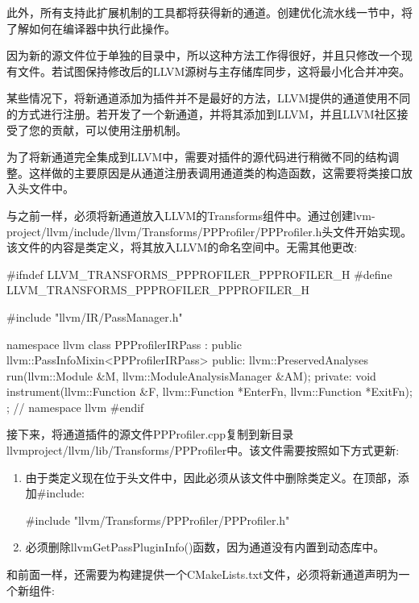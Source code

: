 此外，所有支持此扩展机制的工具都将获得新的通道。创建优化流水线一节中，将了解如何在编译器中执行此操作。

因为新的源文件位于单独的目录中，所以这种方法工作得很好，并且只修改一个现有文件。若试图保持修改后的LLVM源树与主存储库同步，这将最小化合并冲突。

某些情况下，将新通道添加为插件并不是最好的方法，LLVM提供的通道使用不同的方式进行注册。若开发了一个新通道，并将其添加到LLVM，并且LLVM社区接受了您的贡献，可以使用注册机制。


为了将新通道完全集成到LLVM中，需要对插件的源代码进行稍微不同的结构调整。这样做的主要原因是从通道注册表调用通道类的构造函数，这需要将类接口放入头文件中。

与之前一样，必须将新通道放入LLVM的Transforms组件中。通过创建lvm-project/llvm/include/llvm/Transforms/PPProfiler/PPProfiler.h头文件开始实现。该文件的内容是类定义，将其放入LLVM的命名空间中。无需其他更改:

\begin{cpp}
#ifndef LLVM_TRANSFORMS_PPPROFILER_PPPROFILER_H
#define LLVM_TRANSFORMS_PPPROFILER_PPPROFILER_H

#include "llvm/IR/PassManager.h"

namespace llvm {
class PPProfilerIRPass
    : public llvm::PassInfoMixin<PPProfilerIRPass> {
public:
    llvm::PreservedAnalyses
    run(llvm::Module &M, llvm::ModuleAnalysisManager &AM);
private:
    void instrument(llvm::Function &F,
                    llvm::Function *EnterFn,
                    llvm::Function *ExitFn);
};
} // namespace llvm
#endif
\end{cpp}

接下来，将通道插件的源文件PPProfiler.cpp复制到新目录llvmproject/llvm/lib/Transforms/PPProfiler中。该文件需要按照如下方式更新:

\begin{enumerate}
\item
由于类定义现在位于头文件中，因此必须从该文件中删除类定义。在顶部，添加\#include:

\begin{cpp}
#include "llvm/Transforms/PPProfiler/PPProfiler.h"
\end{cpp}

\item
必须删除llvmGetPassPluginInfo()函数，因为通道没有内置到动态库中。
\end{enumerate}

和前面一样，还需要为构建提供一个CMakeLists.txt文件，必须将新通道声明为一个新组件:

